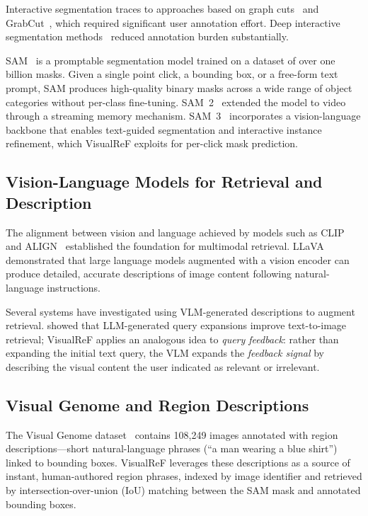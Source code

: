 \documentclass[12pt,a4paper]{article}
\begin{document}
Interactive segmentation traces to approaches based on graph cuts~\citep{Boykov2001}
and GrabCut~\citep{Rother2004}, which required significant user annotation
effort. Deep interactive segmentation methods~\citep{Xu2016,Sofiiuk2022}
reduced annotation burden substantially.

SAM~\citep{Kirillov2023} is a promptable segmentation model trained on a
dataset of over one billion masks. Given a single point click, a bounding box,
or a free-form text prompt, SAM produces high-quality binary masks across a
wide range of object categories without per-class fine-tuning. SAM~2~\citep{Ravi2024}
extended the model to video through a streaming memory mechanism. SAM~3~\citep{Meta2025}
incorporates a vision-language backbone that enables text-guided segmentation
and interactive instance refinement, which VisualReF exploits for per-click
mask prediction.

\subsection{Vision-Language Models for Retrieval and Description}

The alignment between vision and language achieved by models such as
CLIP~\citep{Radford2021} and ALIGN~\citep{Jia2021} established the foundation
for multimodal retrieval. LLaVA~\citep{Liu2023} demonstrated that large
language models augmented with a vision encoder can produce detailed, accurate
descriptions of image content following natural-language instructions.

Several systems have investigated using VLM-generated descriptions to augment
retrieval. \citet{Luo2023} showed that LLM-generated query expansions improve
text-to-image retrieval; VisualReF applies an analogous idea to \emph{query
feedback}: rather than expanding the initial text query, the VLM expands the
\emph{feedback signal} by describing the visual content the user indicated as
relevant or irrelevant.

\subsection{Visual Genome and Region Descriptions}

The Visual Genome dataset~\citep{Krishna2017} contains 108,249 images
annotated with region descriptions—short natural-language phrases (``a man
wearing a blue shirt'') linked to bounding boxes. VisualReF leverages these
descriptions as a source of instant, human-authored region phrases, indexed
by image identifier and retrieved by intersection-over-union (IoU) matching
between the SAM mask and annotated bounding boxes.
\end{document}
